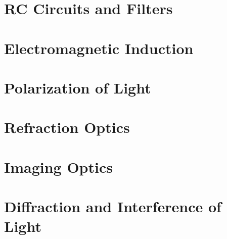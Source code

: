 \documentclass[12pt,letterpaper]{book}
\begin{document}
\chapter{RC Circuits and Filters}


\chapter{Electromagnetic Induction}


\chapter{Polarization of Light}
\label{ch:pol}


\chapter{Refraction Optics}
\label{ch:optics}


\chapter{Imaging Optics}
\label{ch:imaging}


\chapter{Diffraction and Interference of Light}





    
\end{document}
